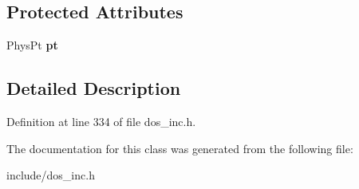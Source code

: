 \subsection*{Protected Attributes}
\begin{DoxyCompactItemize}
\item 
\hypertarget{classMemStruct_acac6123c566805e45fb8ff9e7744d3e2}{Phys\-Pt {\bfseries pt}}\label{classMemStruct_acac6123c566805e45fb8ff9e7744d3e2}

\end{DoxyCompactItemize}


\subsection{Detailed Description}


Definition at line 334 of file dos\-\_\-inc.\-h.



The documentation for this class was generated from the following file\-:\begin{DoxyCompactItemize}
\item 
include/dos\-\_\-inc.\-h\end{DoxyCompactItemize}
